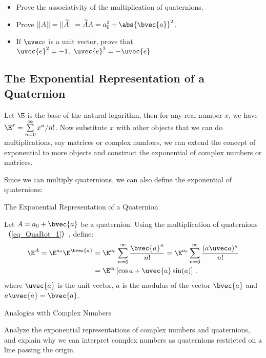 \begin{exercise}{}\label{exe_QuaRot_1}
\begin{itemize}
\item Prove the associativity of the multiplication of quaternions. 
\item Prove $||A||=||\widetilde{A}||=\widetilde{A}A=a_0^2 + \abs{\bvec{a}}^2$. 
\item If $\uvec e$ is a unit vector, prove that $\uvec{e}^2=-1,\ \uvec{e}^3=-\uvec{e}$
\end{itemize}
\end{exercise}

\subsection{The Exponential Representation of a Quaternion}

Let $\E$ is the base of the natural logarithm, then for any real number $x$, we have $\E^x = \sum^\infty\limits_{n=0} x^n / n!$. Now substitute $x$ with other objects that we can do multiplications, say matrices or complex numbers, we can extend the concept of exponential to more objects and construct the exponential of complex numbers or matrices. 

Since we can multiply quaternions, we can also define the exponential of quaternions: 

\begin{definition}{The Exponential Representation of a Quaternion}

Let $A=a_0+\bvec{a}$ be a quaternion. Using the multiplication of quaternions（\autoref{eq_QuaRot_1}）, define: 
\begin{equation}
\begin{aligned}
\E^A=\E^{a_0}\E^{\bvec{a}}&=\E^{a_0}\sum^\infty\limits_{n=0}\frac{\bvec{a}^n}{n!}=\E^{a_0}\sum^\infty\limits_{n=0}\frac{(a \uvec a)^n}{n!}\\&=\E^{a_0}[\cos{a}+\uvec{a}\sin({a})]~.
\end{aligned}
\end{equation}
where $\uvec{a}$ is the unit vector, $a$ is the modulus of the vector $\bvec{a}$ and $a\uvec{a}=\bvec{a}$. 
\end{definition}

\begin{exercise}{Analogies with Complex Numbers}

Analyze the exponential representations of complex numbers and quaternions, and explain why we can interpret complex numbers as quaternions restricted on a line passing the origin. 

\end{exercise}

